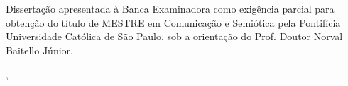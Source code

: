 
    \begin{center}
    {\discente} \\[6.6cm]
    {\titulotrabalho} \\[3.3cm]
    \vfill
    \hspace{.45\textwidth} %
    \begin{minipage}{.5\textwidth}
    Dissertação apresentada à Banca Examinadora como exigência
    parcial para obtenção do título de MESTRE em Comunicação e Semiótica pela
    Pontifícia Universidade Católica de São Paulo, sob a orientação do Prof.
    Doutor Norval Baitello Júnior.
    \end{minipage}
    \vfill
    {\cidade, \estado} \\
    {\ano}
    \end{center}
    \clearpage
